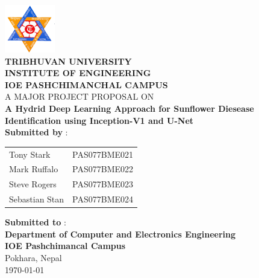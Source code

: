 
\begin{center}
        
        \includegraphics[scale=0.8]{images/fav.png}\\
        \textbf{TRIBHUVAN UNIVERSITY \\[0.5mm]
        \large{INSTITUTE OF ENGINEERING} \\ [2mm]
        \Large{IOE PASHCHIMANCHAL CAMPUS}} \\[3cm]

       A MAJOR PROJECT PROPOSAL ON \\[0.8mm]
       \textbf{A Hydrid Deep Learning Approach for Sunflower Diesease Identification using Inception-V1 and U-Net} \\[3cm]
        \textbf{Submitted by} : \\[2mm]

        \begin{table}[h!]
                \centering
                \begin{tabular}{lc}
                
                Tony Stark & PAS077BME021 \\ 
                Mark Ruffalo     & PAS077BME022 \\
                Steve Rogers    & PAS077BME023 \\
                Sebastian Stan     & PAS077BME024 \\ 
                \end{tabular}
                \end{table} 

        \vspace{4mm}
    
        \textbf{Submitted to} :\\
        \textbf{Department of Computer and Electronics Engineering \\
        IOE Pashchimancal Campus} \\
        Pokhara, Nepal \\[3cm]

        \today
\end{center}